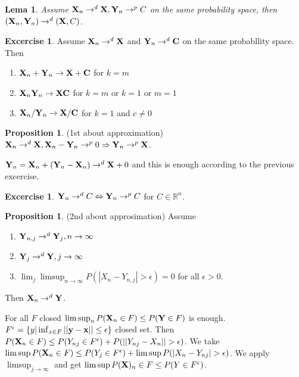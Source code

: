 \documentclass[12pt,a4paper]{amsart}
\theoremstyle{definition} %
\newtheorem{excercise}[defn]{Excercise}
\newtheorem{proposition}[defn]{Proposition}
\theoremstyle{plain} %
\newtheorem{lema}[defn]{Lema}
\newcommand{\R}{\mathbb R}
\begin{document}
\begin{lema}
Assume ${\bf X}_n \rightarrow^d {\bf X}, {\bf Y}_n \rightarrow^p C$ on the same probability space, then $({\bf X}_n, {\bf Y}_n) \rightarrow^d ({\bf X}, C)$.
\end{lema}

\begin{excercise}
Assume ${\bf X}_n \rightarrow^d {\bf X}$ and ${\bf Y}_n \rightarrow^d {\bf C}$ on the same probabllity space. Then
\begin{enumerate}
\item ${\bf X}_n + {\bf Y}_n \rightarrow {\bf X} + {\bf C}$ for $k = m$
\item ${\bf X}_n  {\bf Y}_n \rightarrow {\bf X}  {\bf C}$ for $k = m$ or $k = 1$ or $m = 1$
\item ${\bf X}_n / {\bf Y}_n \rightarrow {\bf X} / {\bf C}$ for $k = 1$ and $c \neq 0$
\end{enumerate}
\end{excercise}

\begin{proposition} (1st about approximation)
${\bf X}_n \rightarrow^d {\bf X}, {\bf X}_n - {\bf Y}_n \rightarrow^p 0 \Rightarrow {\bf Y}_n \rightarrow^p {\bf X}$.
\end{proposition}
\proof
${\bf Y}_n = {\bf X}_n + ({\bf Y}_n - {\bf X}_n) \rightarrow^d {\bf X} + 0$ and this is enough according to the previous excercise.
\endproof

\begin{excercise}
${\bf Y}_n \rightarrow^d C \Leftrightarrow {\bf Y}_n \rightarrow^p C$ for $C \in \R^n$.
\end{excercise}

\begin{proposition} (2nd about approsimation)
Assume 
\begin{enumerate}
\item ${\bf Y}_{n,j}\rightarrow^d {\bf Y}_j, n \rightarrow \infty$
\item ${\bf Y}_j \rightarrow^d {\bf Y}, j \rightarrow \infty$
\item $\lim_j \limsup_{n\rightarrow \infty}{P(|X_n - Y_{n,j}| > \epsilon)} = 0$ for all $\epsilon > 0.$
\end{enumerate}
Then ${\bf X}_n \rightarrow^d {\bf Y}$.
\end{proposition}
\proof
For all $F $ closed $\limsup_n{P({\bf X}_n \in F)} \leq P({\bf Y} \in F)$ is enough. $F^\epsilon = \{y | \inf_{x\in F}||{\bf y} - {\bf x}|| \leq \epsilon \}$ closed set. Then $P({\bf X}_n \in F) \leq P(Y_{n j} \in F^\epsilon) + P(||Y_{n j} - X_n|| > \epsilon)$. We take $\limsup{P({\bf X}_n \in F)} \leq P(Y_j \in F^\epsilon) + \limsup{P(|X_n - Y_{n j}| > \epsilon)}$. We apply $\limsup_{j\rightarrow \infty}$ and get $\limsup{P({\bf X})_n \in F} \leq P(Y \in F^\epsilon)$.
\end{document}
